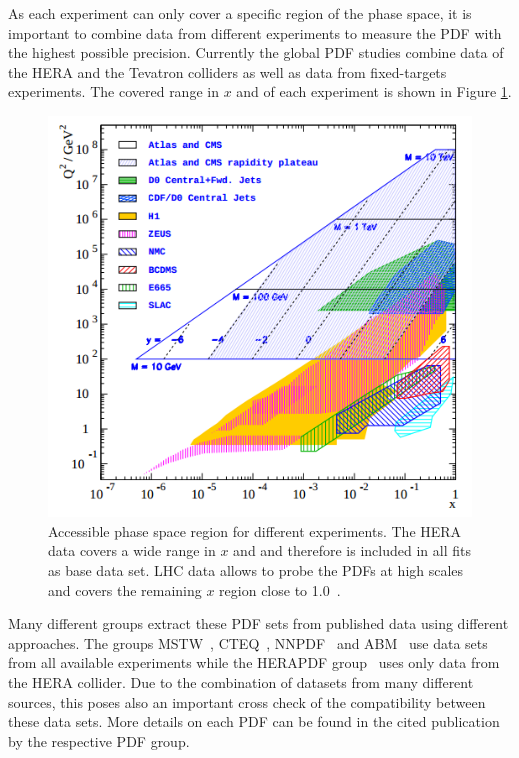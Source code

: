 As each experiment can only cover a specific region of the phase space, it is important to combine data from different experiments to measure the PDF with the highest possible precision. Currently the global PDF studies combine data of the HERA and the Tevatron colliders as well as data from fixed-targets experiments. The covered range in $x$ and \q of each experiment is shown in Figure \ref{kinematic_plane}.


\begin{figure}[htb]
	\centering
  \includegraphics[width=1.0\textwidth]{figures/sm_model/kinematic_plane.png}
 	\caption[Kinematic plane]{Accessible phase space region for different experiments. The HERA data covers a wide range in $x$ and \q and therefore is included in all fits as base data set. LHC data allows to probe the PDFs at high scales and covers the remaining $x$ region close to 1.0~\cite{Glazov:2007zz}.}
 	\label{kinematic_plane}
\end{figure}

Many different groups extract these PDF sets from published data using different approaches. The groups MSTW~\cite{Martin:2009iq}, CTEQ~\cite{Lai:2010vv}, NNPDF~\cite{Ball:2010de} and ABM~\cite{Alekhin:2012du} use data sets from all available experiments while the HERAPDF group~\cite{Aaron:2009aa} uses only data from the HERA collider. Due to the combination of datasets from many different sources, this poses also an important cross check of the compatibility between these data sets. More details on each PDF can be found in the cited publication by the respective PDF group.

